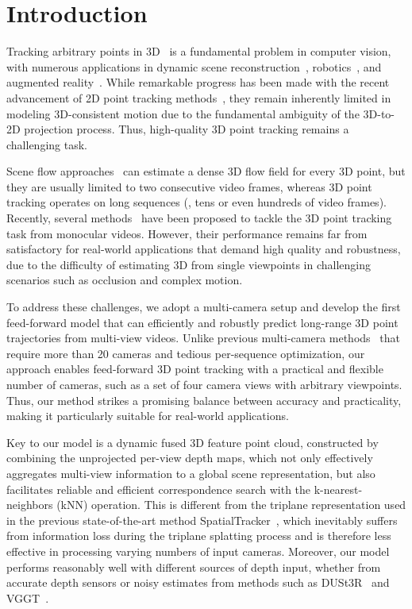 \documentclass[10pt,twocolumn,letterpaper]{article}
\begin{document}
\section{Introduction}
\label{sec:intro}
Tracking arbitrary points in 3D~\cite{vedula1999three} is a fundamental problem in computer vision, with numerous applications in dynamic scene reconstruction~\cite{jin2024stereo4d}, robotics~\cite{fang2023rh20t}, and augmented reality~\cite{pan2023aria}. While remarkable progress has been made with the recent advancement of 2D point tracking methods~\cite{karaev24cotracker3,karaev2023cotracker,harley2022particle,doersch2023tapvid,doersch2023tapir,doersch2024bootstap,cho2024local,zheng2023point}, they remain inherently limited in modeling 3D-consistent motion due to the fundamental ambiguity of the 3D-to-2D projection process. Thus, high-quality 3D point tracking remains a challenging task.

Scene flow approaches~\cite{vedula1999three,richardt2016dense,vogel20113d,teed2021raft} can estimate a dense 3D flow field for every 3D point, but they are usually limited to two consecutive video frames, whereas 3D point tracking operates on long sequences (\eg, tens or even hundreds of video frames). Recently, several methods~\cite{xiao2024spatialtracker,koppula2024tapvid,ngo2024delta} have been proposed to tackle the 3D point tracking task from monocular videos. However, their performance remains far from satisfactory for real-world applications that demand high quality and robustness, due to the difficulty of estimating 3D from single viewpoints in challenging scenarios such as occlusion and complex motion.

To address these challenges, we adopt a multi-camera setup and develop the first feed-forward model that can efficiently and robustly predict long-range 3D point trajectories from multi-view videos. Unlike previous multi-camera methods~\cite{vedula1999three,luiten2023dynamic,zheng2025gstar} that require more than 20 cameras and tedious per-sequence optimization, our approach enables feed-forward 3D point tracking with a practical and flexible number of cameras, such as a set of four camera views with arbitrary viewpoints. Thus, our method strikes a promising balance between accuracy and practicality, making it particularly suitable for real-world applications.

Key to our model is a dynamic fused 3D feature point cloud, constructed by combining the unprojected per-view depth maps, which not only effectively aggregates multi-view information to a global scene representation, but also facilitates reliable and efficient correspondence search with the k-nearest-neighbors (kNN) operation. This is different from the triplane representation used in the previous state-of-the-art method SpatialTracker~\cite{xiao2024spatialtracker}, which inevitably suffers from information loss during the triplane splatting process and is therefore less effective in processing varying numbers of input cameras. Moreover, our model performs reasonably well with different sources of depth input, whether from accurate depth sensors or noisy estimates from methods such as DUSt3R~\cite{wang2024dust3r} and VGGT~\cite{wang2025vggt}.
\end{document}

